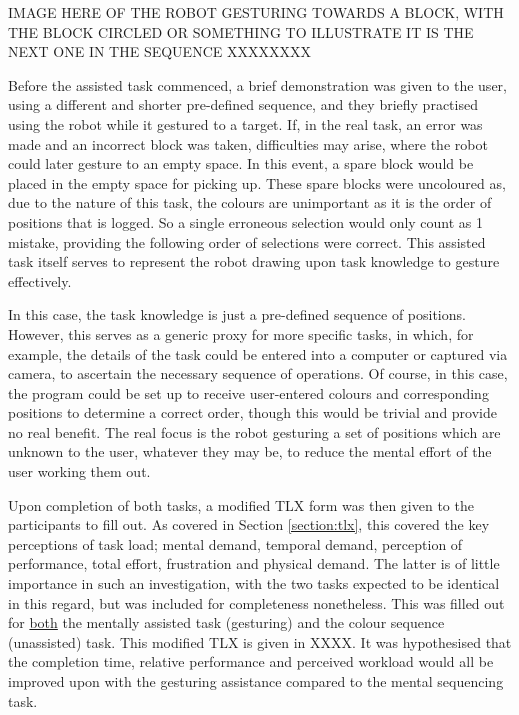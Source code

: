 \documentclass[11pt]{article}
\begin{document}
IMAGE HERE OF THE ROBOT GESTURING TOWARDS A BLOCK, WITH THE BLOCK CIRCLED OR SOMETHING TO ILLUSTRATE IT IS THE NEXT ONE IN THE SEQUENCE 
XXXXXXXX

Before the assisted task commenced, a brief demonstration was given to the user, using a different and shorter pre-defined sequence, and they briefly practised using the robot while it gestured to a target. If, in the real task, an error was made and an incorrect block was taken, difficulties may arise, where the robot could later gesture to an empty space. In this event, a spare block would be placed in the empty space for picking up. These spare blocks were uncoloured as, due to the nature of this task, the colours are unimportant as it is the order of positions that is logged. So a single erroneous selection would only count as 1 mistake, providing the following order of selections were correct. This assisted task itself serves to represent the robot drawing upon task knowledge to gesture effectively. 

In this case, the task knowledge is just a pre-defined sequence of positions. However, this serves as a generic proxy for more specific tasks, in which, for example, the details of the task could be entered into a computer or captured via camera, to ascertain the necessary sequence of operations. Of course, in this case, the program could be set up to receive user-entered colours and corresponding positions to determine a correct order, though this would be trivial and provide no real benefit. The real focus is the robot gesturing a set of positions which are unknown to the user, whatever they may be, to reduce the mental effort of the user working them out.

Upon completion of both tasks, a modified TLX form was then given to the participants to fill out. As covered in Section \ref{section:tlx}, this covered the key perceptions of task load; mental demand, temporal demand, perception of performance, total effort, frustration and physical demand. The latter is of little importance in such an investigation, with the two tasks expected to be identical in this regard, but was included for completeness nonetheless. This was filled out for \underline{both} the mentally assisted task (gesturing) and the colour sequence (unassisted) task. This modified TLX is given in XXXX. It was hypothesised that the completion time, relative performance and perceived workload would all be improved upon with the gesturing assistance compared to the mental sequencing task.
\end{document}
